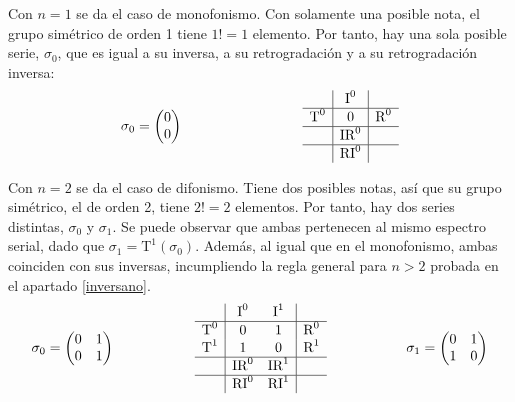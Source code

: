 		Con $n=1$ se da el caso de monofonismo. Con solamente una posible nota, el grupo simétrico de orden 1 tiene $1!=1$ elemento. Por tanto, hay una sola posible serie, $\sigma_0$, que es igual a su inversa, a su retrogradación y a su retrogradación inversa:
		$$\sigma_0=\left(\begin{matrix}0\\0\end{matrix}\right)\hspace{3cm}\begin{array}{l|c|r}&\text{I}^{0}&\\\hline\text{T}^{0}&0&\text{R}^{0}\\\hline&\text{IR}^{0}&\\\hline&\text{RI}^{0}&\end{array}$$
	
		Con $n=2$ se da el caso de difonismo. Tiene dos posibles notas, así que su grupo simétrico, el de orden 2, tiene $2!=2$ elementos. Por tanto, hay dos series distintas, $\sigma_0$ y $\sigma_1$. Se puede observar que ambas pertenecen al mismo espectro serial, dado que $\sigma_1=\text{T}^1(\sigma_0)$. Además, al igual que en el monofonismo, ambas coinciden con sus inversas, incumpliendo la regla general para $n>2$ probada en el apartado \ref{inversano}.
		$$\sigma_0=\left(\begin{matrix}0&1\\0&1\end{matrix}\right) \hspace{2cm}\begin{array}{l|cc|r}&\text{I}^{0}&\text{I}^{1}&\\\hline\text{T}^{0}&0&1&\text{R}^{0}\\\text{T}^{1}&1&0&\text{R}^{1}\\\hline&\text{IR}^{0}&\text{IR}^{1}&\\\hline&\text{RI}^{0}&\text{RI}^{1}&\end{array}\hspace{2cm} \sigma_1=\left(\begin{matrix}0&1\\1&0\end{matrix}\right)$$